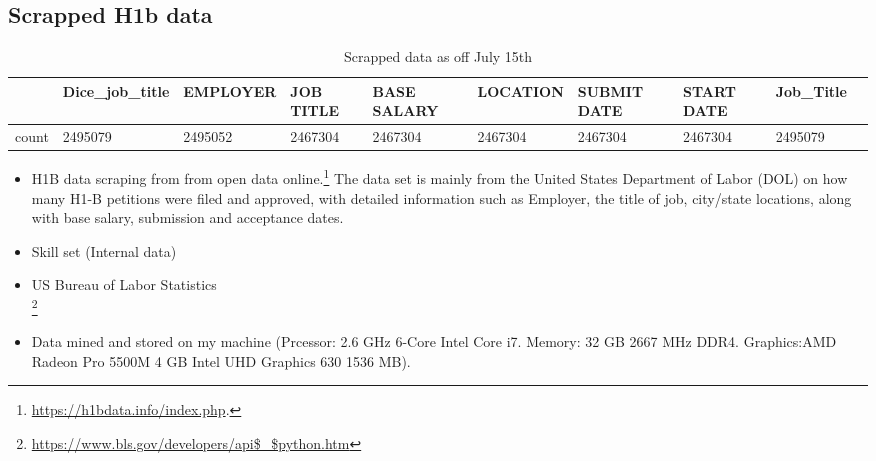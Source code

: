 \subsection{Scrapped H1b data}
{%
	\begin{table}[h]
		\caption{Scrapped data as off July 15th}
		\begin{tabular}{llllllllll}
			\hline
			{} &   Dice\_job\_title &                           EMPLOYER &        JOB TITLE & BASE SALARY &      LOCATION & SUBMIT DATE &  START DATE &        Job\_Title  \\
			\hline
			count  &          2495079 &                            2495052 &          2467304 &     2467304 &       2467304 &     2467304 &     2467304 &          2495079  \\
			\hline
		\end{tabular}
	\end{table}
}
\begin{itemize}
	\item 	H1B data  scraping from  from open data online.\footnote{\url{https://h1bdata.info/index.php}.}
	The data set is mainly from the United States Department of Labor (DOL) on how many H1-B petitions were filed and approved, with detailed information such as Employer, the title of  job, city/state locations, along with base salary,  submission and acceptance dates. 
	\item Skill set (Internal data)
	\item US Bureau of Labor Statistics \\
	\footnote{\url{https://www.bls.gov/developers/api$\_$python.htm}
	}
	\item Data mined and stored on my machine (Prcessor: 2.6 GHz 6-Core Intel Core i7. Memory: 32 GB 2667 MHz DDR4. Graphics:AMD Radeon Pro 5500M 4 GB
	Intel UHD Graphics 630 1536 MB).
\end{itemize}
